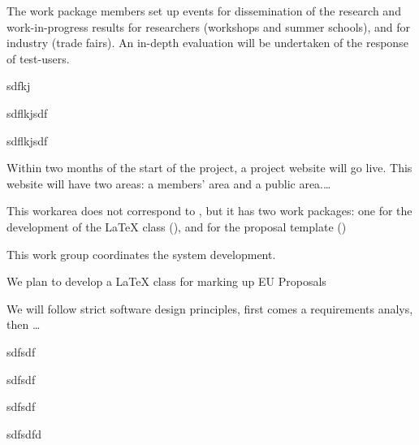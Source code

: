 \begin{workplan}
\begin{workarea}[id=mansubsus,title={Management, Support \& Sustainability}, short=Management]
\begin{workpackage}[id=dissem,lead=pcg,
 title=Dissemination and Exploitation,
pcgRM=8,jacuRAM=2]
 The work package members set up events for dissemination of the research and
 work-in-progress results for researchers (workshops and summer schools), and for industry
 (trade fairs). An in-depth evaluation will be undertaken of the response of test-users.
 
 \begin{tasklist}
  \begin{task}[id=t1,wphases=6-7]
    sdfkj
  \end{task}
  \begin{task}[wphases=12-13]
    sdflkjsdf
  \end{task}
  \begin{task}[wphases=18-19]
    sdflkjsdf
  \end{task}
 \begin{task}[wphases=22-24] 
 \end{task}
\end{tasklist}

Within two months of the start of the project, a project website will go live. This
website will have two areas: a members' area and a public area.\ldots
\end{workpackage}
\end{workarea}
 

\begin{workarea}[id=systems,title={System Development}]
  This workarea does not correspond to , but it has two work packages:
  one for the development of the {\LaTeX} class ({}), and for the
  proposal template ({})

  This work group coordinates the system development.

\begin{workpackage}[id=class,lead=jacu,
                    title=A LaTeX class for EU Proposals,short=Class,
                   jacuRM=12,jacuRAM=8,pcgRM=12,pcgRAM=2]
We plan to develop a {\LaTeX} class for marking up EU Proposals

We will follow strict software design principles, first comes a
requirements analys, then \ldots
\begin{tasklist}
  \begin{task}[wphases=0-2]
    sdfsdf
  \end{task}
  \begin{task}[wphases=4-8]
    sdfsdf
  \end{task}
  \begin{task}[id=t3,wphases=10-14]
    sdfsdf
  \end{task}
  \begin{task}[wphases=20-24]
    sdfsdfd
  \end{task}
\end{tasklist}
\end{workpackage} 


\end{workarea}
\end{workplan}
